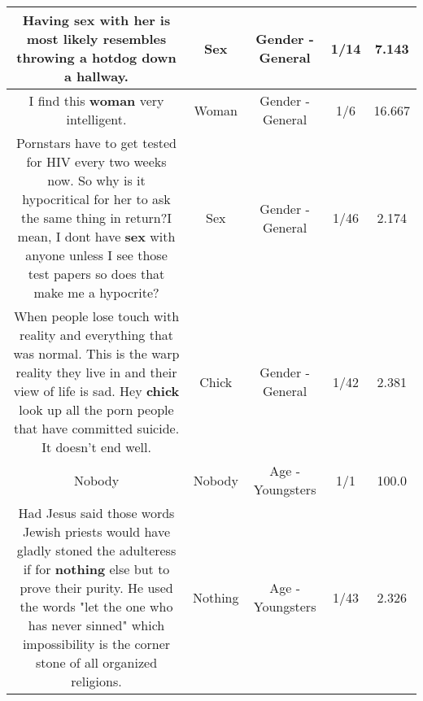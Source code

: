 \documentclass[11pt]{article}
\newlength\mylength
\begin{document}
\begin{center}
\begin{longtable}{|C{.65\mylength}|C{.30\mylength}|C{.12\mylength}|C{.12\mylength}|C{.12\mylength}|}
  \small Having \textbf{sex} with her is most likely resembles throwing a hotdog down a hallway.\normalsize   & Sex & Gender - General & 1/14 & 7.143 \\  \hline
  \small I find this \textbf{woman} very intelligent.\normalsize   & Woman & Gender - General & 1/6 & 16.667 \\  \hline
  \small Pornstars have to get tested for HIV every two weeks now. So why is it hypocritical for her to ask the same thing in return?I mean, I dont have \textbf{sex} with anyone unless I see those test papers so does that make me a hypocrite?\normalsize   & Sex & Gender - General & 1/46 & 2.174 \\  \hline
  \small When people lose touch with reality and everything that was  normal. This is the warp reality they live in and their view of life is sad. Hey \textbf{chick} look up all the porn people that have committed suicide. It doesn't end well.\normalsize   & Chick & Gender - General & 1/42 & 2.381 \\  \hline
  \small Nobody\normalsize   & Nobody & Age - Youngsters & 1/1 & 100.0 \\  \hline
  \small Had Jesus said those words Jewish priests would have gladly stoned the adulteress if for \textbf{nothing} else but to prove their purity. He used the words "let the one who has never sinned" which impossibility is the corner stone of all organized religions.\normalsize   & Nothing & Age - Youngsters & 1/43 & 2.326 \\  \hline

\end{longtable}
\end{center}
\end{document}
